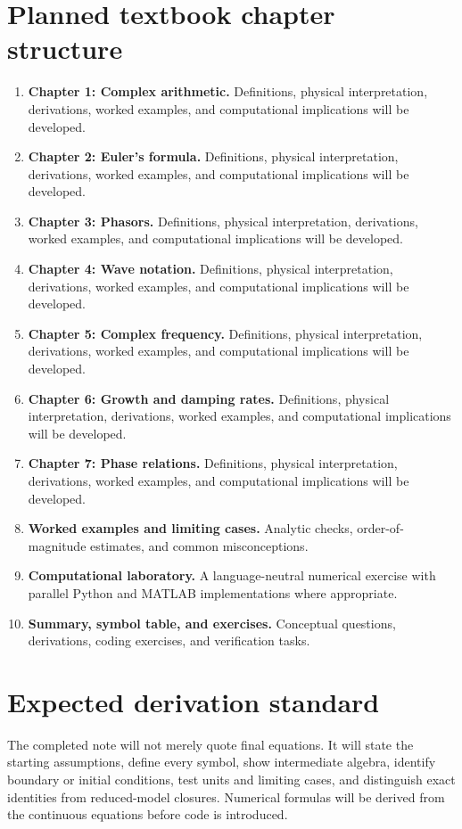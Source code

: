 \documentclass[11pt]{article}
\begin{document}
\section{Planned textbook chapter structure}
\begin{enumerate}[leftmargin=1.8em]
\item \textbf{Chapter 1: Complex arithmetic.} Definitions, physical interpretation, derivations, worked examples, and computational implications will be developed.
\item \textbf{Chapter 2: Euler's formula.} Definitions, physical interpretation, derivations, worked examples, and computational implications will be developed.
\item \textbf{Chapter 3: Phasors.} Definitions, physical interpretation, derivations, worked examples, and computational implications will be developed.
\item \textbf{Chapter 4: Wave notation.} Definitions, physical interpretation, derivations, worked examples, and computational implications will be developed.
\item \textbf{Chapter 5: Complex frequency.} Definitions, physical interpretation, derivations, worked examples, and computational implications will be developed.
\item \textbf{Chapter 6: Growth and damping rates.} Definitions, physical interpretation, derivations, worked examples, and computational implications will be developed.
\item \textbf{Chapter 7: Phase relations.} Definitions, physical interpretation, derivations, worked examples, and computational implications will be developed.
\item \textbf{Worked examples and limiting cases.} Analytic checks, order-of-magnitude estimates, and common misconceptions.
\item \textbf{Computational laboratory.} A language-neutral numerical exercise with parallel Python and MATLAB implementations where appropriate.
\item \textbf{Summary, symbol table, and exercises.} Conceptual questions, derivations, coding exercises, and verification tasks.
\end{enumerate}

\section{Expected derivation standard}
The completed note will not merely quote final equations. It will state the starting assumptions, define every symbol, show intermediate algebra, identify boundary or initial conditions, test units and limiting cases, and distinguish exact identities from reduced-model closures. Numerical formulas will be derived from the continuous equations before code is introduced.
\end{document}
